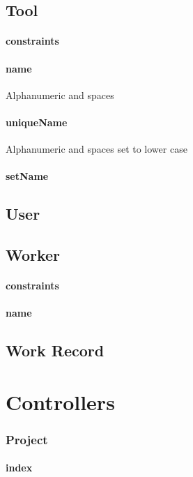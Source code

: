 \documentclass[12pt]{article}
\begin{document}
\setcounter{paragraph}{0}
\subsection{Tool}
\paragraph{constraints}
\paragraph{name} Alphanumeric and spaces 
\paragraph{uniqueName} Alphanumeric and spaces  set to lower case
\paragraph{setName}

\setcounter{paragraph}{0}
\subsection{User}
\subsection{Worker}
\paragraph{constraints}
\paragraph{name}

\setcounter{paragraph}{0}
\subsection{Work Record}

\section{Controllers}\label{sec:Controllers}

\subsubsection{Project}
\paragraph{index}
\end{document}
